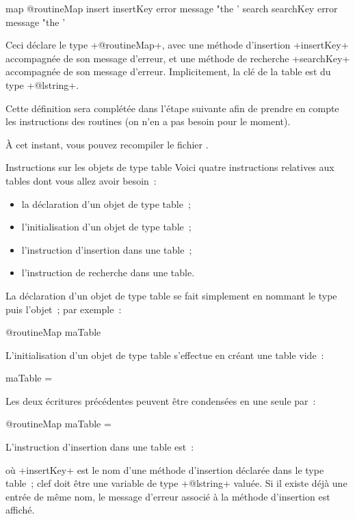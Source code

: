 \begin{galgas4}
map @routineMap {
  insert insertKey error message "the '%
  search searchKey error message "the '%
}
\end{galgas4}

Ceci déclare le type \ggsq+@routineMap+, avec une méthode d'insertion \ggsq+insertKey+ accompagnée de son message d'erreur, et une méthode de recherche \ggsq+searchKey+ accompagnée de son message d'erreur. Implicitement, la clé de la table est du type \ggsq+@lstring+.

Cette définition sera complétée dans l'étape suivante afin de prendre en compte les instructions des routines (on n'en a pas besoin pour le moment).

À cet instant, vous pouvez recompiler le fichier .

Instructions sur les objets de type table
Voici quatre instructions relatives aux tables dont vous allez avoir besoin~:
\begin{itemize}
  \item la déclaration d'un objet de type table~;
  \item l'initialisation d'un objet de type table~;
  \item l'instruction d'insertion dans une table~;
  \item l'instruction de recherche dans une table.
\end{itemize}

La déclaration d'un objet de type table se fait simplement en nommant le type puis l'objet~; par exemple~:
\begin{galgas4}
@routineMap maTable
\end{galgas4}

L'initialisation d'un objet de type table s'effectue en créant une table vide~:
\begin{galgas4}
maTable = {}
\end{galgas4}

Les deux écritures précédentes peuvent être condensées en une seule par~:
\begin{galgas4}
@routineMap maTable = {}
\end{galgas4}

L'instruction d'insertion dans une table est~:
\begin{galgas4}
\end{galgas4}
où \ggsq+insertKey+ est le nom d'une méthode d'insertion déclarée dans le type table~; clef doit être une variable de type \ggsq+@lstring+ valuée. Si il existe déjà une entrée de même nom, le message d'erreur associé à la méthode d'insertion est affiché.

